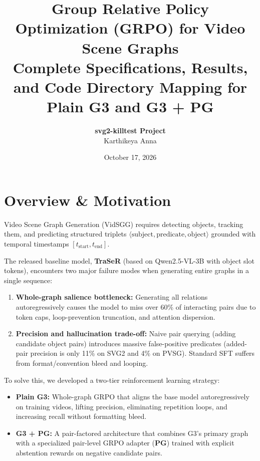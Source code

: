 \documentclass[11pt,a4paper]{article}
\title{\textbf{Group Relative Policy Optimization (GRPO) for Video Scene Graphs}\\[3pt]
\large Complete Specifications, Results, and Code Directory Mapping for Plain G3 and G3 + PG}
\author{\textbf{svg2-killtest Project} \\ Karthikeya Anna}
\date{October 17, 2026}
\begin{document}
\maketitle
\vspace{-6mm}

\section{Overview \& Motivation}
Video Scene Graph Generation (VidSGG) requires detecting objects, tracking them, and predicting structured triplets $\langle \text{subject}, \text{predicate}, \text{object} \rangle$ grounded with temporal timestamps $[t_{\text{start}}, t_{\text{end}}]$. 

The released baseline model, \textbf{TraSeR} (based on Qwen2.5-VL-3B with object slot tokens), encounters two major failure modes when generating entire graphs in a single sequence:
\begin{enumerate}
    \item \textbf{Whole-graph salience bottleneck:} Generating all relations autoregressively causes the model to miss over 60\% of interacting pairs due to token caps, loop-prevention truncation, and attention dispersion.
    \item \textbf{Precision and hallucination trade-off:} Naive pair querying (adding candidate object pairs) introduces massive false-positive predicates (added-pair precision is only 11\% on SVG2 and 4\% on PVSG). Standard SFT suffers from format/convention bleed and looping.
\end{enumerate}

To solve this, we developed a two-tier reinforcement learning strategy:
\begin{itemize}
    \item \textbf{Plain G3:} Whole-graph GRPO that aligns the base model autoregressively on training videos, lifting precision, eliminating repetition loops, and increasing recall without formatting bleed.
    \item \textbf{G3 + PG:} A pair-factored architecture that combines G3's primary graph with a specialized pair-level GRPO adapter (\textbf{PG}) trained with explicit abstention rewards on negative candidate pairs.
\end{itemize}

\end{document}

